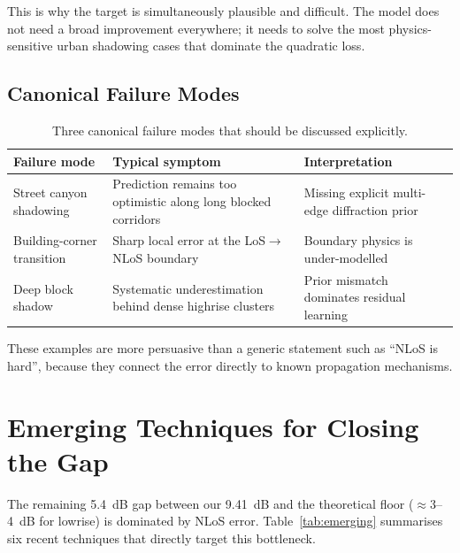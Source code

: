 \documentclass[11pt,a4paper]{article}
\begin{document}
This is why the target is simultaneously plausible and difficult. The model does
not need a broad improvement everywhere; it needs to solve the most physics-
sensitive urban shadowing cases that dominate the quadratic loss.

\subsection{Canonical Failure Modes}

\begin{table}[h!]
\centering
\caption{Three canonical failure modes that should be discussed explicitly.}
\label{tab:failuremodes}
\begin{tabularx}{\textwidth}{lXX}
\toprule
\textbf{Failure mode} & \textbf{Typical symptom} & \textbf{Interpretation} \\
\midrule
Street canyon shadowing & Prediction remains too optimistic along long blocked corridors & Missing explicit multi-edge diffraction prior \\
Building-corner transition & Sharp local error at the LoS$\rightarrow$NLoS boundary & Boundary physics is under-modelled \\
Deep block shadow & Systematic underestimation behind dense highrise clusters & Prior mismatch dominates residual learning \\
\bottomrule
\end{tabularx}
\end{table}

These examples are more persuasive than a generic statement such as ``NLoS is
hard'', because they connect the error directly to known propagation mechanisms.

\section{Emerging Techniques for Closing the Gap}
\label{sec:emerging}

The remaining 5.4~dB gap between our 9.41~dB and the theoretical floor
($\approx$3--4~dB for lowrise) is dominated by NLoS error.
Table~\ref{tab:emerging} summarises six recent techniques that directly
target this bottleneck.
\end{document}
